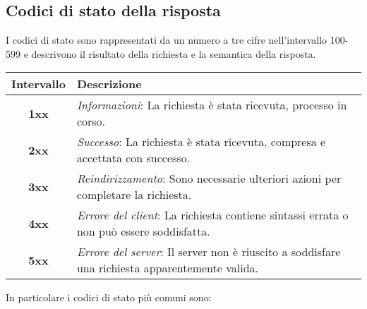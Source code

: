 \documentclass[12pt]{article}
\begin{document}
\subsection{Codici di stato della risposta}
I codici di stato sono rappresentati da un numero a tre cifre nell'intervallo 100-599 e descrivono il risultato della richiesta e la semantica della risposta.
\begin{center}
\begin{tabularx}{\textwidth}{ |c|X| }
\hline
\textbf{Intervallo} & \textbf{Descrizione}\\
\hline\hline
\textbf{1xx} & \textit{Informazioni}: La richiesta è stata ricevuta, processo in corso.\\
\hline
\textbf{2xx} & \textit{Successo}: La richiesta è stata ricevuta, compresa e accettata con successo.\\
\hline
\textbf{3xx} & \textit{Reindirizzamento}: Sono necessarie ulteriori azioni per completare la richiesta.\\
\hline
\textbf{4xx} & \textit{Errore del client}: La richiesta contiene sintassi errata o non può essere soddisfatta.\\
\hline
\textbf{5xx} & \textit{Errore del server}: Il server non è riuscito a soddisfare una richiesta apparentemente valida.\\
\hline
\end{tabularx}
\end{center}
In particolare i codici di stato più comuni sono:
\end{document}
